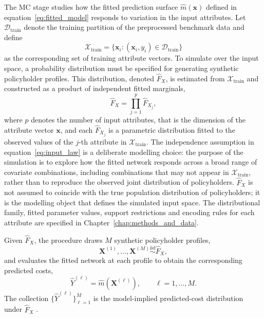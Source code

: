 \noindent
The MC stage studies how the fitted prediction surface
\(\widehat{m}(\mathbf{x})\) defined in equation~\eqref{eq:fitted_model} responds
to variation in the input attributes. Let \(\mathcal{D}_{\mathrm{train}}\)
denote the training partition of the preprocessed benchmark data and define
\begin{equation}
\label{eq:training_attributes}
    \mathcal{X}_{\mathrm{train}}
    =
    \bigl\{\mathbf{x}_i : (\mathbf{x}_i, y_i)
    \in \mathcal{D}_{\mathrm{train}}\bigr\}
\end{equation}
as the corresponding set of training attribute vectors. To simulate over the
input space, a probability distribution must be specified for generating
synthetic policyholder profiles. This distribution, denoted \(\widehat{F}_{X}\), is estimated from
\(\mathcal{X}_{\mathrm{train}}\) and constructed as a product of independent
fitted marginals,
\begin{equation}
\label{eq:input_law}
    \widehat{F}_{X}
    =
    \prod_{j=1}^{p} \widehat{F}_{X_j},
\end{equation}
where \(p\) denotes the number of input attributes, that is the dimension of
the attribute vector \(\mathbf{x}\), and each \(\widehat{F}_{X_j}\) is a
parametric distribution fitted to the observed values of the \(j\)-th
attribute in \(\mathcal{X}_{\mathrm{train}}\).
The independence assumption in equation~\eqref{eq:input_law} is a deliberate
modelling choice: the purpose of the simulation is to explore how the fitted
network responds across a broad range of covariate combinations, including
combinations that may not appear in \(\mathcal{X}_{\mathrm{train}}\), rather
than to reproduce the observed joint distribution of policyholders.
\(\widehat{F}_{X}\) is not assumed to coincide with the true population
distribution of policyholders; it is the modelling object that defines the
simulated input space. The distributional family, fitted parameter values,
support restrictions and encoding rules for each attribute are specified in
Chapter~\ref{chap:methods_and_data}.

\noindent
Given \(\widehat{F}_{X}\), the procedure draws \(M\) synthetic policyholder
profiles,
\begin{equation}
\label{eq:mc_sample_framework}
    \mathbf{X}^{(1)}, \ldots, \mathbf{X}^{(M)}
    \stackrel{\mathrm{iid}}{\sim}
    \widehat{F}_{X},
\end{equation}
and evaluates the fitted network at each profile to obtain the corresponding
predicted costs,
\begin{equation}
\label{eq:mc_predictions_framework}
    \widehat{Y}^{(\ell)}
    =
    \widehat{m}\!\left(\mathbf{X}^{(\ell)}\right),
    \qquad \ell = 1, \ldots, M.
\end{equation}
The collection \(\{\widehat{Y}^{(\ell)}\}_{\ell=1}^{M}\) is the
model-implied predicted-cost distribution under \(\widehat{F}_{X}\)
\citep{glasserman2004monte, rubinstein2016simulation, owen2013monte}.

